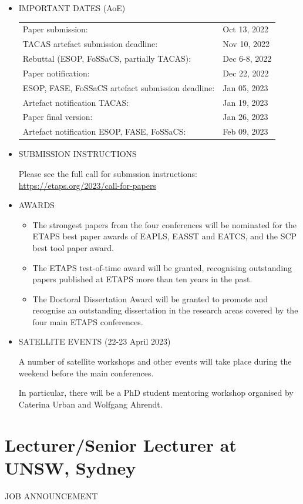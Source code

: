 \documentclass[prodmode,acmtecs]{acmsmall} %
\begin{document}
\begin{itemize}
\item  IMPORTANT DATES (AoE) 
 
\begin{tabulary}{\linewidth}{LL}Paper submission:  & Oct 13, 2022 \\
TACAS artefact submission deadline:  & Nov 10, 2022 \\
Rebuttal (ESOP, FoSSaCS, partially TACAS):  & Dec 6-8, 2022 \\
Paper notification:  & Dec 22, 2022 \\
ESOP, FASE, FoSSaCS artefact submission deadline:  & Jan 05, 2023 \\
Artefact notification TACAS:  & Jan 19, 2023 \\
Paper final version:  & Jan 26, 2023 \\
Artefact notification ESOP, FASE, FoSSaCS:  & Feb 09, 2023 \\
\end{tabulary}
 
\item  SUBMISSION INSTRUCTIONS  
 
  Please see the full call for submssion instructions: \href{https://etaps.org/2023/call-for-papers}{https://etaps.org/2023/call-for-papers} 
 
\item  AWARDS 
 
\begin{itemize}\item  The strongest papers from the four conferences will be nominated for the ETAPS best paper awards of EAPLS, EASST and EATCS, and the SCP best tool paper award.
\item  The ETAPS test-of-time award will be granted, recognising outstanding papers published at ETAPS more than ten years in the past.
\item  The Doctoral Dissertation Award will be granted to promote and recognise an outstanding dissertation in the research areas covered by the four main ETAPS conferences. 
\end{itemize} 
\item  SATELLITE EVENTS (22-23 April 2023)  
 
  A number of satellite workshops and other events will take place during the weekend before the main conferences. 
 
  In particular, there will be a PhD student mentoring workshop organised by Caterina Urban and Wolfgang Ahrendt. 
 
\end{itemize}\section{Lecturer/Senior Lecturer at UNSW, Sydney}\label{LecturerSeniorLectureratUNSWSydney}JOB ANNOUNCEMENT 
\end{document}
